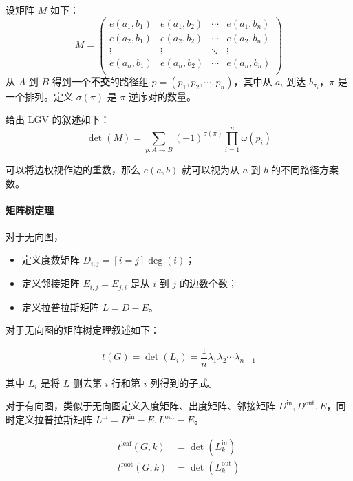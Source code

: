 \documentclass[10pt]{ctexart}
\providecommand{\tightlist}{\setlength{\itemsep}{0pt}\setlength{\parskip}{0pt}}
\begin{document}
\begin{multicols}{3}
    设矩阵 \(M\) 如下：\[
    M = \begin{pmatrix}
    e(a_1, b_1) & e(a_1, b_2) & \cdots & e(a_1, b_n) \\
    e(a_2, b_1) & e(a_2, b_2) & \cdots & e(a_2, b_n) \\
    \vdots & \vdots & \ddots & \vdots \\
    e(a_n, b_1) & e(a_n, b_2) & \cdots & e(a_n, b_n) \\
    \end{pmatrix}
    \] 从 \(A\) 到 \(B\) 得到一个\textbf{不交}的路径组
    \(p=(p_1, p_2, \cdots,p_n)\)，其中从 \(a_i\) 到达
    \(b_{\pi_i}\)，\(\pi\) 是一个排列。定义 \(\sigma(\pi)\) 是 \(\pi\)
    逆序对的数量。

    给出 LGV 的叙述如下：\[
    \det(M) = \sum_{p:A\to B} (-1)^{\sigma (\pi)} \prod_{i=1}^n \omega(p_i)
    \]

    可以将边权视作边的重数，那么 \(e(a, b)\) 就可以视为从 \(a\) 到 \(b\)
    的不同路径方案数。

    \paragraph{矩阵树定理}\label{ux77e9ux9635ux6811ux5b9aux7406}

    对于无向图，

    \begin{itemize}
    \tightlist
    \item
      定义度数矩阵 \(D_{i, j} = [i=j]\deg(i)\)；
    \item
      定义邻接矩阵 \(E_{i, j} = E_{j, i}\) 是从 \(i\) 到 \(j\)
      的边数个数；
    \item
      定义拉普拉斯矩阵 \(L = D - E\)。
    \end{itemize}

    对于无向图的矩阵树定理叙述如下：

    \[t(G) = \det(L_i) = \frac{1}{n}\lambda_1\lambda_2\cdots \lambda_{n-1}\]

    其中 \(L_i\) 是将 \(L\) 删去第 \(i\) 行和第 \(i\) 列得到的子式。

    对于有向图，类似于无向图定义入度矩阵、出度矩阵、邻接矩阵
    \(D^{\mathrm{in}}, D^{\mathrm{out}}, E\)，同时定义拉普拉斯矩阵
    \(L^{\mathrm{in}} = D^{\mathrm{in}} - E,L^{\mathrm{out}} - E\)。

    \[\begin{aligned}
    t^{\mathrm{leaf}}(G, k) &= \det(L^{\mathrm{in}}_k) \\
    t^{\mathrm{root}}(G, k) &= \det(L^{\mathrm{out}}_k) \\
    \end{aligned}\]


\end{multicols}
\end{document}
